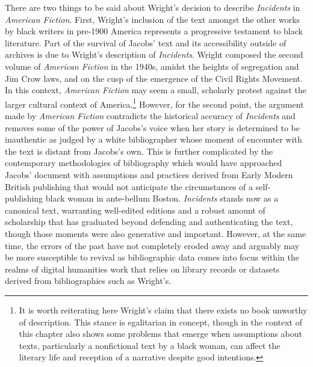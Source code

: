 There are two things to be said about Wright's decision to describe \textit{Incidents} in \textit{American Fiction}. First, Wright's inclusion of the text amongst the other works by black writers in pre-1900 America represents a progressive testament to black literature. Part of the survival of Jacobs' text and its accessibility outside of archives is due to Wright's description of \textit{Incidents}. Wright composed the second volume of \textit{American Fiction} in the 1940s, amidst the heights of segregation and Jim Crow laws, and on the cusp of the emergence of the Civil Rights Movement. In this context, \textit{American Fiction} may seem a small, scholarly protest against the larger cultural context of America.\footnote{It is worth reiterating here Wright's claim that there exists no book unworthy of description. This stance is egalitarian in concept, though in the context of this chapter also shows some problems that emerge when assumptions about texts, particularly a nonfictional text by a black woman, can affect the literary life and reception of a narrative despite good intentions.} However, for the second point, the argument made by \textit{American Fiction} contradicts the historical accuracy of \textit{Incidents} and removes some of the power of Jacobs's voice when her story is determined to be inauthentic as judged by a white bibliographer whose moment of encounter with the text is distant from Jacobs's own. This is further complicated by the contemporary methodologies of bibliography which would have approached Jacobs' document with assumptions and practices derived from Early Modern British publishing that would not anticipate the circumstances of a self-publishing black woman in ante-bellum Boston. \textit{Incidents} stands now as a canonical text, warranting well-edited editions and a robust amount of scholarship that has graduated beyond defending and authenticating the text, though those moments were also generative and important. However, at the same time, the errors of the past have not completely eroded away and arguably may be more susceptible to revival as bibliographic data comes into focus within the realms of digital humanities work that relies on library records or datasets derived from bibliographies such as Wright's. 


